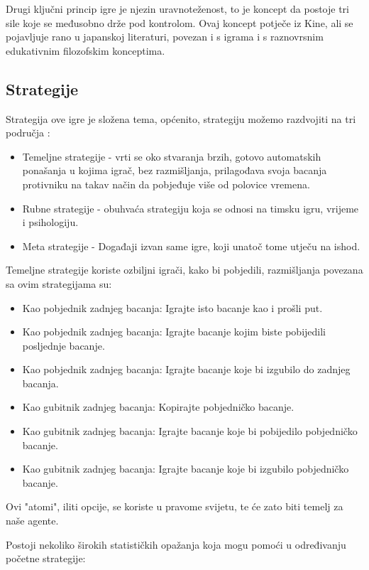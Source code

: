 \documentclass{foi}
\begin{document}
Drugi ključni princip igre je njezin uravnoteženost\cite{towardsAI2020}, to je koncept da postoje tri sile koje se međusobno drže pod kontrolom. Ovaj koncept potječe iz Kine, ali se pojavljuje rano u japanskoj literaturi, povezan i s igrama i s raznovrsnim edukativnim filozofskim konceptima.

\subsection{Strategije}

Strategija ove igre je složena tema, općenito, strategiju možemo razdvojiti na tri područja \cite{towardsAI2020}:

\begin{itemize}
    \item Temeljne strategije - vrti se oko stvaranja brzih, gotovo automatskih ponašanja u kojima igrač, bez razmišljanja, prilagođava svoja bacanja protivniku na takav način da pobjeđuje više od polovice vremena.
    \item Rubne strategije - obuhvaća strategiju koja se odnosi na timsku igru, vrijeme i psihologiju.
    \item Meta strategije - Događaji izvan same igre, koji unatoč tome utječu na ishod.
\end{itemize}

Temeljne strategije koriste ozbiljni igrači, kako bi pobjedili, razmišljanja povezana sa ovim strategijama su:
\begin{itemize}
    \item Kao pobjednik zadnjeg bacanja: Igrajte isto bacanje kao i prošli put.
    \item Kao pobjednik zadnjeg bacanja: Igrajte bacanje kojim biste pobijedili posljednje bacanje.
    \item Kao pobjednik zadnjeg bacanja: Igrajte bacanje koje bi izgubilo do zadnjeg bacanja.
    \item Kao gubitnik zadnjeg bacanja: Kopirajte pobjedničko bacanje.
    \item Kao gubitnik zadnjeg bacanja: Igrajte bacanje koje bi pobijedilo pobjedničko bacanje.
    \item Kao gubitnik zadnjeg bacanja: Igrajte bacanje koje bi izgubilo pobjedničko bacanje.
\end{itemize}
    
Ovi "atomi", iliti opcije, se koriste u pravome svijetu, te će zato biti temelj za naše agente.

Postoji nekoliko širokih statističkih opažanja koja mogu pomoći u određivanju početne strategije:
\end{document}
